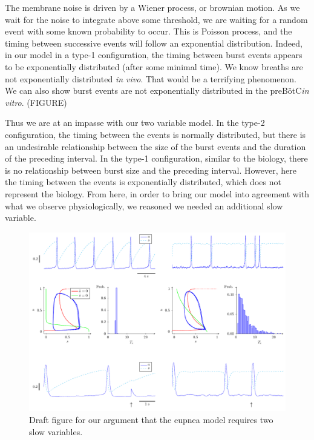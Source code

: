 \documentclass[12pt]{article}
\def\pre{preB\"otC\xspace}
\begin{document}
The membrane noise is driven by a Wiener process, or brownian motion. As we wait for the noise to integrate above some threshold, we are waiting for a random event with some known probability to occur. This is Poisson process, and the timing between successive events will follow an exponential distribution. Indeed, in our model in a type-1 configuration, the timing between burst events appears to be exponentially distributed (after some minimal time). We know breaths are not exponentially distributed \textit{in vivo}. That would be a terrifying phenomenon. We can also show burst events are not exponentially distributed in the \pre \textit{in vitro}. (FIGURE)

Thus we are at an impasse with our two variable model. In the type-2 configuration, the timing between the events is normally distributed, but there is an undesirable relationship between the size of the burst events and the duration of the preceding interval. In the type-1 configuration, similar to the biology, there is no relationship between burst size and the preceding interval. However, here the timing between the events is exponentially distributed, which does not represent the biology. From here, in order to bring our model into agreement with what we observe physiologically, we reasoned we needed an additional slow variable. 

\begin{figure}[h!]
\centering 
 \includegraphics[width=\textwidth]{Fig01TabakRinzelOneVarIntro}
\caption{Draft figure for our argument that the eupnea model requires two slow variables. }
\label{TabakRinzelOneVarIntro}
\end{figure}
\end{document}
